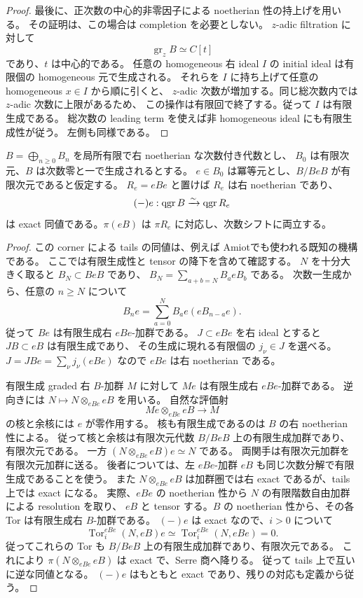 \begin{proof}
最後に、正次数の中心的非零因子による noetherian 性の持上げを用いる。
その証明は、この場合は completion を必要としない。
$z$-adic filtration に対して
\[
 \operatorname{gr}_z B\simeq C[t]
\]
であり、$t$ は中心的である。
任意の homogeneous 右 ideal $I$ の initial ideal は有限個の homogeneous 元で生成される。
それらを $I$ に持ち上げて任意の homogeneous $x\in I$ から順に引くと、
$z$-adic 次数が増加する。同じ総次数内では $z$-adic 次数に上限があるため、
この操作は有限回で終了する。従って $I$ は有限生成である。
総次数の leading term を使えば非 homogeneous ideal にも有限生成性が従う。
左側も同様である。
\end{proof}

\begin{lemma}
\label{lem:cofinite-corner-tails}
$B=\bigoplus_{n\ge0}B_n$ を局所有限で右 noetherian な次数付き代数とし、
$B_0$ は有限次元、$B$ は次数零と一で生成されるとする。
$e\in B_0$ は冪等元とし、$B/BeB$ が有限次元であると仮定する。
$R_e=eBe$ と置けば $R_e$ は右 noetherian であり、
\[
 (-)e:\operatorname{qgr} B\xrightarrow{\sim}\operatorname{qgr} R_e
\]
は exact 同値である。$\pi(eB)$ は $\pi R_e$ に対応し、次数シフトに両立する。
\end{lemma}
\begin{proof}
この corner による tails の同値は、例えば
Amiot\cite[Corollary 3.3の証明]{AmiotCorners}でも使われる既知の機構である。
ここでは有限生成性と tensor の降下を含めて確認する。
$N$ を十分大きく取ると $B_N\subset BeB$ であり、
$B_N=\sum_{a+b=N}B_aeB_b$ である。
次数一生成から、任意の $n\ge N$ について
\[
 B_ne=\sum_{a=0}^{N}B_ae(eB_{n-a}e).
\]
従って $Be$ は有限生成右 $eBe$-加群である。
$J\subset eBe$ を右 ideal とすると $JB\subset eB$ は有限生成であり、
その生成に現れる有限個の $j_\nu\in J$ を選べる。
$J=JBe=\sum_\nu j_\nu(eBe)$ なので $eBe$ は右 noetherian である。

有限生成 graded 右 $B$-加群 $M$ に対して $Me$ は有限生成右 $eBe$-加群である。
逆向きには $N\mapsto N\otimes_{eBe}eB$ を用いる。
自然な評価射
\[
 Me\otimes_{eBe}eB\longrightarrow M
\]
の核と余核には $e$ が零作用する。
核も有限生成であるのは $B$ の右 noetherian 性による。
従って核と余核は有限次元代数 $B/BeB$ 上の有限生成加群であり、有限次元である。
一方 $(N\otimes_{eBe}eB)e\simeq N$ である。
両関手は有限次元加群を有限次元加群に送る。
後者については、左 $eBe$-加群 $eB$ も同じ次数分解で有限生成であることを使う。
また $N\otimes_{eBe}eB$ は加群圏では右 exact であるが、tails 上では exact になる。
実際、$eBe$ の noetherian 性から $N$ の有限階数自由加群による resolution を取り、
$eB$ と tensor する。$B$ の noetherian 性から、その各 Tor は有限生成右 $B$-加群である。
$(-)e$ は exact なので、$i>0$ について
\[
 \operatorname{Tor}^{eBe}_i(N,eB)e
 \simeq\operatorname{Tor}^{eBe}_i(N,eBe)=0.
\]
従ってこれらの Tor も $B/BeB$ 上の有限生成加群であり、有限次元である。
これにより $\pi(N\otimes_{eBe}eB)$ は exact で、Serre 商へ降りる。
従って tails 上で互いに逆な同値となる。
$(-)e$ はもともと exact であり、残りの対応も定義から従う。
\end{proof}

